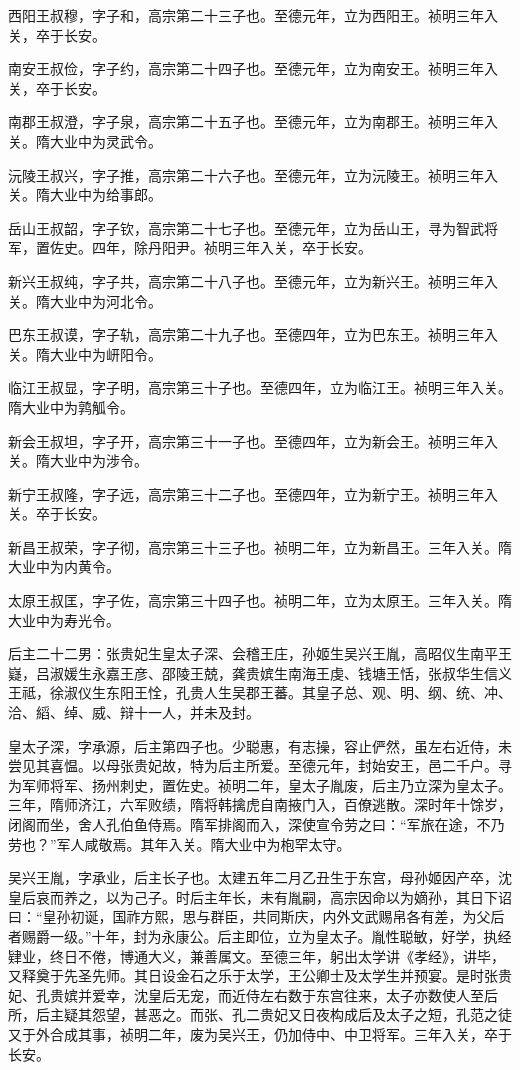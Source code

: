 \documentclass[]{article}
\begin{document}
西阳王叔穆，字子和，高宗第二十三子也。至德元年，立为西阳王。祯明三年入关，卒于长安。

南安王叔俭，字子约，高宗第二十四子也。至德元年，立为南安王。祯明三年入关，卒于长安。

南郡王叔澄，字子泉，高宗第二十五子也。至德元年，立为南郡王。祯明三年入关。隋大业中为灵武令。

沅陵王叔兴，字子推，高宗第二十六子也。至德元年，立为沅陵王。祯明三年入关。隋大业中为给事郎。

岳山王叔韶，字子钦，高宗第二十七子也。至德元年，立为岳山王，寻为智武将军，置佐史。四年，除丹阳尹。祯明三年入关，卒于长安。

新兴王叔纯，字子共，高宗第二十八子也。至德元年，立为新兴王。祯明三年入关。隋大业中为河北令。

巴东王叔谟，字子轨，高宗第二十九子也。至德四年，立为巴东王。祯明三年入关。隋大业中为岍阳令。

临江王叔显，字子明，高宗第三十子也。至德四年，立为临江王。祯明三年入关。隋大业中为鹑觚令。

新会王叔坦，字子开，高宗第三十一子也。至德四年，立为新会王。祯明三年入关。隋大业中为涉令。

新宁王叔隆，字子远，高宗第三十二子也。至德四年，立为新宁王。祯明三年入关。卒于长安。

新昌王叔荣，字子彻，高宗第三十三子也。祯明二年，立为新昌王。三年入关。隋大业中为内黄令。

太原王叔匡，字子佐，高宗第三十四子也。祯明二年，立为太原王。三年入关。隋大业中为寿光令。

后主二十二男：张贵妃生皇太子深、会稽王庄，孙姬生吴兴王胤，高昭仪生南平王嶷，吕淑媛生永嘉王彦、邵陵王兢，龚贵嫔生南海王虔、钱塘王恬，张叔华生信义王祗，徐淑仪生东阳王恮，孔贵人生吴郡王蕃。其皇子总、观、明、纲、统、冲、洽、縚、绰、威、辩十一人，并未及封。

皇太子深，字承源，后主第四子也。少聪惠，有志操，容止俨然，虽左右近侍，未尝见其喜愠。以母张贵妃故，特为后主所爱。至德元年，封始安王，邑二千户。寻为军师将军、扬州刺史，置佐史。祯明二年，皇太子胤废，后主乃立深为皇太子。三年，隋师济江，六军败绩，隋将韩擒虎自南掖门入，百僚逃散。深时年十馀岁，闭阁而坐，舍人孔伯鱼侍焉。隋军排阁而入，深使宣令劳之曰：``军旅在途，不乃劳也？''军人咸敬焉。其年入关。隋大业中为枹罕太守。

吴兴王胤，字承业，后主长子也。太建五年二月乙丑生于东宫，母孙姬因产卒，沈皇后哀而养之，以为己子。时后主年长，未有胤嗣，高宗因命以为嫡孙，其日下诏曰：``皇孙初诞，国祚方熙，思与群臣，共同斯庆，内外文武赐帛各有差，为父后者赐爵一级。''十年，封为永康公。后主即位，立为皇太子。胤性聪敏，好学，执经肄业，终日不倦，博通大义，兼善属文。至德三年，躬出太学讲《孝经》，讲毕，又释奠于先圣先师。其日设金石之乐于太学，王公卿士及太学生并预宴。是时张贵妃、孔贵嫔并爱幸，沈皇后无宠，而近侍左右数于东宫往来，太子亦数使人至后所，后主疑其怨望，甚恶之。而张、孔二贵妃又日夜构成后及太子之短，孔范之徒又于外合成其事，祯明二年，废为吴兴王，仍加侍中、中卫将军。三年入关，卒于长安。
\end{document}
